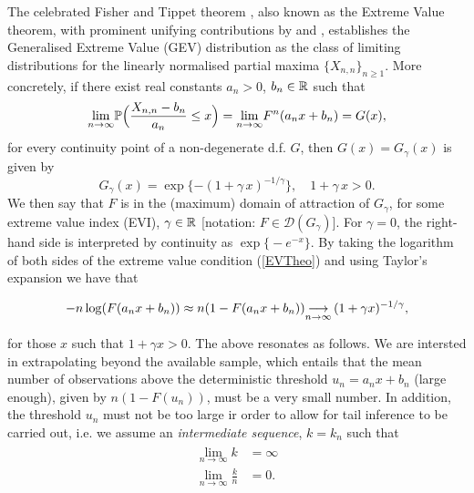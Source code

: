 The celebrated Fisher and Tippet theorem \citep{ft28}, also known as the Extreme Value theorem, with prominent unifying contributions by \cite{Gnedenko:43} and \cite{deHaan:70}, establishes the Generalised Extreme Value (GEV) distribution as the class of limiting distributions for the linearly normalised partial maxima $\{X_{n,n} \}_{n\geq 1}$. More concretely, if there exist real constants $a_n>0$, $b_n \in {\mathbb{R}}$ such that
\begin{equation}\label{EVTheo}
	\displaystyle {\lim_{n \rightarrow{\infty}}} \mathbb{P} \Bigl( \frac{X_{n,n}-b_n}{a_n} \leq x\Bigr)= \displaystyle {\lim_{n \rightarrow{\infty}}} F^n (a_n x + b_n) = G(x),
\end{equation}
for every continuity point of a non-degenerate d.f. $G$, then $G(x)= G_{\gamma}(x)$ is given by
\begin{equation}\label{GEVd}
	G_{\gamma}(x)= \exp \{ -(1+ \gamma\, x)^{-1/\gamma}\}, \quad 1+\gamma\,x >0.
\end{equation}
We then say that $F$ is in the (maximum) domain of attraction of $G_\gamma$,  for some extreme value index (EVI), $\gamma \in {\mathbb{R}}$ [notation: $F \in \mathcal{D}(G_{\gamma}) $]. For $\gamma=0$, the right-hand side is interpreted by continuity as $\exp\bigl\{-e^{-x}\bigr\}$. By taking the logarithm of both sides of the extreme value condition (\ref{EVTheo}) and using Taylor's expansion we have that 


\begin{equation}
-n\log(F(a_n x + b_n )) \approx n(1 - F(a_n x + b_n )) \displaystyle {\mathop {\longrightarrow}_{n \rightarrow \infty}\,} (1 + \gamma x )^{-1/\gamma},
\end{equation}

\noindent for those $x$ such that $ 1 + \gamma x > 0 $. The above resonates as follows. We are intersted in extrapolating beyond the available sample, which entails that the mean number of observations above the deterministic threshold $ u_n = a_n x + b_n$ (large enough), given by $ n( 1- F(u_n)) $, must be a very small number. In addition, the threshold $ u_n $ must not be too large ir order to allow for tail inference to be carried out, i.e. we assume an \textit{intermediate sequence}, $ k = k_n $ such that %
\begin{align} \label{eq:k_cond}
\begin{split}
\lim_{n \rightarrow \infty} k &= \infty \\
\lim_{n \rightarrow \infty} \frac{k}{n} &= 0.
\end{split}
\end{align}

